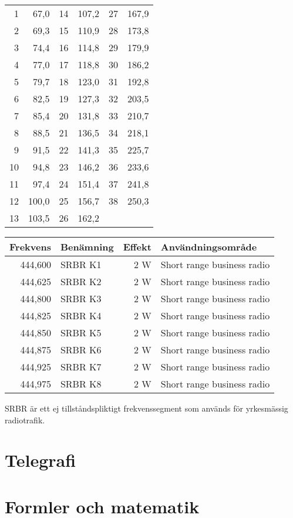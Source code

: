 \documentclass[12pt,swedish,a4paper]{article}
\begin{document}
\begin{tabular}{rr|rr|rr}
	 1 &  67,0 & 14 & 107,2 & 27 & 167,9 \\
	 2 &  69,3 & 15 & 110,9 & 28 & 173,8 \\
	 3 &  74,4 & 16 & 114,8 & 29 & 179,9 \\
	 4 &  77,0 & 17 & 118,8 & 30 & 186,2 \\
	 5 &  79,7 & 18 & 123,0 & 31 & 192,8 \\
	 6 &  82,5 & 19 & 127,3 & 32 & 203,5 \\
	 7 &  85,4 & 20 & 131,8 & 33 & 210,7 \\
	 8 &  88,5 & 21 & 136,5 & 34 & 218,1 \\
	 9 &  91,5 & 22 & 141,3 & 35 & 225,7 \\
	10 &  94,8 & 23 & 146,2 & 36 & 233,6 \\
	11 &  97,4 & 24 & 151,4 & 37 & 241,8 \\
	12 & 100,0 & 25 & 156,7 & 38 & 250,3 \\
	13 & 103,5 & 26 & 162,2 &    &
\end{tabular}

\begin{tabular}{rlrl}
	Frekvens & Benämning & Effekt & Användningsområde          \\ \hline
	 444,600 & SRBR K1   &    2 W & Short range business radio \\
	 444,625 & SRBR K2   &    2 W & Short range business radio \\
	 444,800 & SRBR K3   &    2 W & Short range business radio \\
	 444,825 & SRBR K4   &    2 W & Short range business radio \\
	 444,850 & SRBR K5   &    2 W & Short range business radio \\
	 444,875 & SRBR K6   &    2 W & Short range business radio \\
	 444,925 & SRBR K7   &    2 W & Short range business radio \\
	 444,975 & SRBR K8   &    2 W & Short range business radio
\end{tabular}

SRBR är ett ej tillståndspliktigt frekvenssegment som används för yrkesmässig radiotrafik.

\section{Telegrafi}

\section{Formler och matematik}
\end{document}
